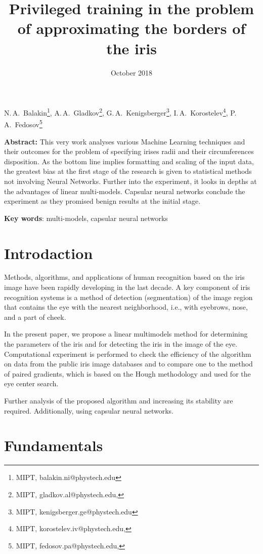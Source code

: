 \documentclass{article}
\date{October 2018}
\begin{document}
\title{Privileged training in the problem of approximating the borders of the iris}
\date{}
\maketitle
\begin{center}
   {N.\,A.~Balakin\footnote{MIPT, balakin.ni@phystech.edu},
   A.\,A.~Gladkov\footnote{MIPT, gladkov.al@phystech.edu,},
   G.\,A.~Kenigsberger\footnote{MIPT, kenigsberger.ge@phystech.edu},
   I.\,A.~Korostelev\footnote{MIPT, korostelev.iv@phystech.edu,},
   P.\,A.~Fedosov\footnote{MIPT, fedosov.pa@phystech.edu,}
   }
\end{center}


\textbf{Abstract:} This very work analyses various Machine Learning techniques and their outcomes for the problem of specifying irises radii and their circumferences disposition. As the bottom line implies formatting and scaling of the input data, the greatest bias at the first stage of the research is given to statistical methods not involving Neural Networks. Further into the experiment, it looks in depths at the advantages of linear multi-models. Capsular neural networks conclude the experiment as they promised benign results at the initial stage. 



\bigskip
\textbf{Key words}: multi-models, capsular neural networks

\section {Introdaction}
Methods, algorithms, and applications of human recognition based on the iris image have been rapidly
developing in the last decade. A key component of iris recognition systems is a method of detection (segmentation) of the image region that contains the eye with the nearest neighborhood, i.e., with eyebrows, nose,
and a part of cheek. 

In the present paper, we propose a linear multimodels method\cite{11-Aduenko_main} for determining the parameters of the iris and for detecting the iris in the image of the eye. 
Computational experiment is performed to check the efficiency of the algorithm on data from the public iris image databases\cite{ Iris Image Database (CASIA)} and to compare
one to the method of paired gradients\cite{Efimov2015IrisBorderRecognition}, which is based on the Hough methodology and used for the eye center search. 

Further analysis of the proposed algorithm and increasing its stability are required. Additionally, using capsular neural networks.
\section {Fundamentals}

\maketitle


\end{document}
